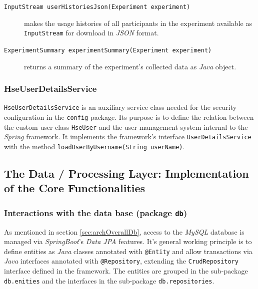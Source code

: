 \documentclass[a4paper]{usiinfbachelorproject}
\begin{document}
\begin{description}
        \item[\texttt{InputStream userHistoriesJson(Experiment experiment)}] makes the usage histories of all participants
                    in the experiment available as \texttt{InputStream} for download in \emph{JSON} format.

        \item[\texttt{ExperimentSummary experimentSummary(Experiment experiment)}] returns a summary of the experiment's collected data
                    as \emph{Java} object.

    \end{description}


\subsubsection{\textbf{HseUserDetailsService}}

\texttt{HseUserDetailsService} is an auxiliary service class needed for the security configuration in the
\texttt{config} package. Its purpose is to define the relation between the custom user class \texttt{HseUser} 
and the user management system internal to the \emph{Spring} framework. It implements the framework's
interface \texttt{UserDetailsService} with the method \texttt{loadUserByUsername(String userName)}.


\subsection{\textbf{The Data / Processing Layer: Implementation of the Core Functionalities}} \label{sec:archDataLayer}

\subsubsection{\textbf{Interactions with the data base (package \texttt{db})}} \label{sec:archDataLayerDb}

As mentioned in section \ref{sec:archOverallDb}, access to the \emph{MySQL} database is managed via \emph{SpringBoot}'s
\emph{Data JPA} features. It's general working principle is to define entities as \emph{Java} classes annotated
with \texttt{@Entity} and allow transactions via \emph{Java} interfaces annotated with \texttt{@Repository},
extending the \texttt{CrudRepository} interface defined in the framework. 
The entities are grouped in the sub-package \texttt{db.enities} and the
interfaces in the sub-package \texttt{db.repositories}.
\end{document}
